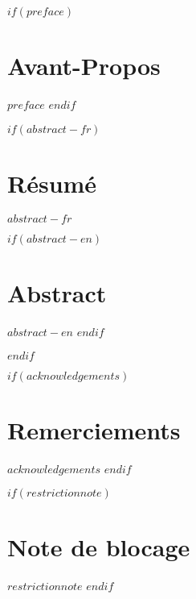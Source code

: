 
\renewcommand{\contentsname}{Table des matières}

$if(preface)$
\chapter*{Avant-Propos}
$preface$
$endif$

$if(abstract-fr)$
\cleardoublepage
\begin{minipage}{\linewidth}

\chapter*{Résumé}
$abstract-fr$

$if(abstract-en)$
\chapter*{Abstract}
$abstract-en$
$endif$

\end{minipage}
\cleardoublepage
$endif$

$if(acknowledgements)$
\chapter*{Remerciements}
$acknowledgements$
$endif$



$if(restrictionnote)$
\chapter*{Note de blocage}
$restrictionnote$
$endif$



\cleardoublepage
